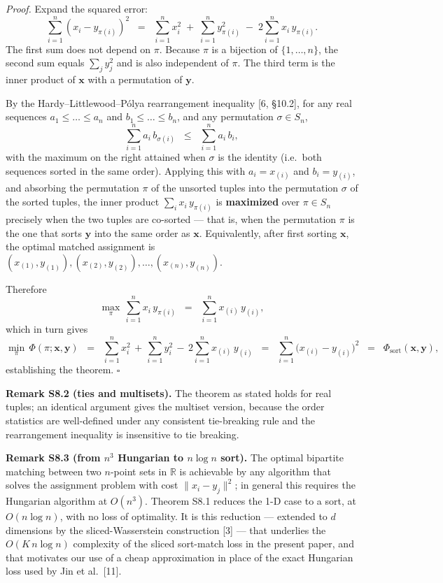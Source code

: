 \documentclass[
  11pt,
  a4paper,
]{article}
\begin{document}
\emph{Proof.} Expand the squared error:
\[
\sum_{i=1}^{n}(x_{i} - y_{\pi(i)})^{2}
\;\;=\;\;
\sum_{i=1}^{n} x_{i}^{2}
\;+\;
\sum_{i=1}^{n} y_{\pi(i)}^{2}
\;-\;
2\sum_{i=1}^{n} x_{i}\,y_{\pi(i)}.
\]
The first sum does not depend on \(\pi\). Because \(\pi\) is a bijection
of \(\{1, \dots, n\}\), the second sum equals
\(\sum_{j} y_{j}^{2}\) and is also independent of \(\pi\). The third
term is the inner product of \(\mathbf{x}\) with a permutation of
\(\mathbf{y}\).

By the Hardy--Littlewood--Pólya rearrangement inequality {[}6, §10.2{]},
for any real sequences \(a_{1} \leq \dots \leq a_{n}\) and
\(b_{1} \leq \dots \leq b_{n}\), and any permutation \(\sigma \in S_{n}\),
\[
\sum_{i=1}^{n} a_{i}\,b_{\sigma(i)}
\;\;\leq\;\;
\sum_{i=1}^{n} a_{i}\,b_{i},
\]
with the maximum on the right attained when \(\sigma\) is the
identity (i.e.~both sequences sorted in the same order). Applying
this with \(a_{i} = x_{(i)}\) and \(b_{i} = y_{(i)}\), and absorbing
the permutation \(\pi\) of the unsorted tuples into the permutation
\(\sigma\) of the sorted tuples, the inner product
\(\sum_{i} x_{i}\,y_{\pi(i)}\) is \textbf{maximized} over
\(\pi \in S_{n}\) precisely when the two tuples are co-sorted ---
that is, when the permutation \(\pi\) is the one that sorts \(\mathbf{y}\)
into the same order as \(\mathbf{x}\). Equivalently, after first
sorting \(\mathbf{x}\), the optimal matched assignment is
\((x_{(1)}, y_{(1)}), (x_{(2)}, y_{(2)}), \dots, (x_{(n)}, y_{(n)})\).

Therefore
\[
\max_{\pi}\, \sum_{i=1}^{n} x_{i}\,y_{\pi(i)}
\;\;=\;\;
\sum_{i=1}^{n} x_{(i)}\,y_{(i)},
\]
which in turn gives
\[
\min_{\pi}\, \Phi(\pi; \mathbf{x}, \mathbf{y})
\;\;=\;\;
\sum_{i=1}^{n} x_{i}^{2}
\,+\,
\sum_{i=1}^{n} y_{i}^{2}
\,-\,
2\sum_{i=1}^{n} x_{(i)}\,y_{(i)}
\;\;=\;\;
\sum_{i=1}^{n} \bigl(x_{(i)} - y_{(i)}\bigr)^{2}
\;\;=\;\;
\Phi_{\mathrm{sort}}(\mathbf{x}, \mathbf{y}),
\]
establishing the theorem. \(\square\)

\textbf{Remark S8.2 (ties and multisets).} The theorem as stated holds
for real tuples; an identical argument gives the multiset version,
because the order statistics are well-defined under any consistent
tie-breaking rule and the rearrangement inequality is insensitive
to tie breaking.

\textbf{Remark S8.3 (from \(n^{3}\) Hungarian to \(n\log n\) sort).} The
optimal bipartite matching between two \(n\)-point sets in \(\mathbb{R}\)
is achievable by any algorithm that solves the assignment problem
with cost \(\|x_{i} - y_{j}\|^{2}\); in general this requires the
Hungarian algorithm at \(O(n^{3})\). Theorem S8.1 reduces the 1-D
case to a sort, at \(O(n \log n)\), with no loss of optimality. It
is this reduction --- extended to \(d\) dimensions by the
sliced-Wasserstein construction {[}3{]} --- that underlies the
\(O(K\,n \log n)\) complexity of the sliced sort-match loss in the
present paper, and that motivates our use of a cheap approximation
in place of the exact Hungarian loss used by Jin et al.~{[}11{]}.
\end{document}
